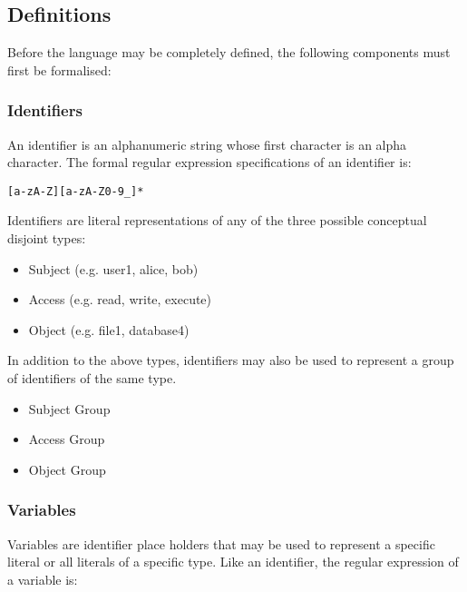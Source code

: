 \documentclass[a4paper]{article}
\begin{document}
    \subsection{Definitions}

      Before the language may be completely defined, the following components 
      must first be formalised:
 
      \subsubsection{Identifiers}

        An identifier is an alphanumeric string whose first character is an
        alpha character. The formal regular expression specifications of an
        identifier is:

\begin{verbatim}
[a-zA-Z][a-zA-Z0-9_]*
\end{verbatim}

        Identifiers are literal representations of any of the three possible
        conceptual disjoint types:

        \begin{itemize}
          \item Subject (e.g. user1, alice, bob)
          \item Access (e.g. read, write, execute)
          \item Object (e.g. file1, database4)
        \end{itemize}

        In addition to the above types, identifiers may also be used to
        represent a group of identifiers of the same type.

        \begin{itemize}
          \item Subject Group
          \item Access Group
          \item Object Group
        \end{itemize}

      \subsubsection{Variables}

        Variables are identifier place holders that may be used to represent a
        specific literal or all literals of a specific type. Like an identifier,
        the regular expression of a variable is:
\end{document}
